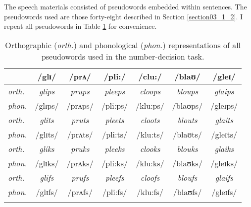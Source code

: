 The speech materials consisted of pseudowords embedded within sentences. The pseudowords used are those forty-eight described in Section \ref{section03_1_2}. I repeat all pseudowords in Table \ref{tab:8.1} for convenience.

\begin{table}\fontsize{10}{11}
\caption{Orthographic (\textit{orth.}) and phonological (\textit{phon.}) representations of all pseudowords used in the number-decision task.}
\label{tab:8.1}
\centering
\begin{tabular}{lcccccc} 
\lsptoprule
~              & /glɪ/          & /prʌ/          & /pli:/          & /clu:/          & /blaʊ/          & /gleɪ/           \\ 
\midrule
\textit{orth.} & \textit{glips} & \textit{prups} & \textit{pleeps} & \textit{cloops} & \textit{bloups} & \textit{glaips}  \\
\textit{phon.} & /glɪps/        & /prʌps/        & /pli:ps/        & /klu:ps/        & /blaʊps/        & /gleɪps/         \\ 
\midrule
\textit{orth.} & \textit{glits} & \textit{pruts} & \textit{pleets} & \textit{cloots} & \textit{blouts} & \textit{glaits}  \\
\textit{phon.} & /glɪts/        & /prʌts/        & /pli:ts/        & /klu:ts/        & /blaʊts/        & /gleɪts/         \\ 
\midrule
\textit{orth.} & \textit{gliks} & \textit{pruks} & \textit{pleeks} & \textit{clooks} & \textit{blouks} & \textit{glaiks}  \\
\textit{phon.} & /glɪks/        & /prʌks/        & /pli:ks/        & /klu:ks/        & /blaʊks/        & /gleɪks/         \\ 
\midrule
\textit{orth.} & \textit{glifs} & \textit{prufs} & \textit{pleefs} & \textit{cloofs} & \textit{bloufs} & \textit{glaifs}  \\
\textit{phon.} & /glɪfs/        & /prʌfs/        & /pli:fs/        & /klu:fs/        & /blaʊfs/        & /gleɪfs/         \\
\lspbottomrule
\end{tabular}
\end{table}


